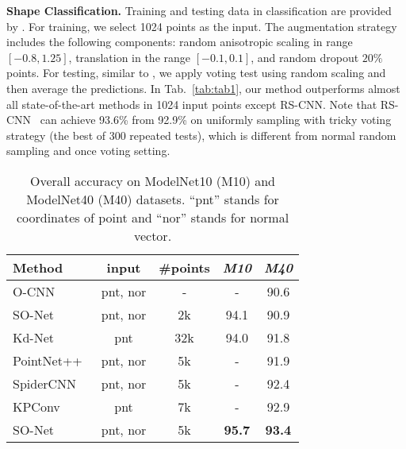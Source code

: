 \documentclass[10pt,twocolumn,letterpaper]{article}
\begin{document}
	
	
	{\noindent\bf Shape Classification.}  Training and testing data in classification are provided by \cite{pointnet}. For training, we select 1024 points as the input. The augmentation strategy includes the following components: random anisotropic scaling in range $[-0.8, 1.25]$, translation in the range $[-0.1, 0.1]$, and random dropout $20\%$ points. For testing, similar to \cite{pointnet,pointnet2}, we apply voting test using random scaling and then average the predictions. 	In Tab.~\ref{tab:tab1}, our method outperforms almost all state-of-the-art methods in 1024 input points except RS-CNN. Note that RS-CNN~\cite{rscnn} can achieve 93.6\% from 92.9\% on uniformly sampling with tricky voting strategy (the best of 300 repeated tests), which is different from normal random sampling and once voting setting.
	
	
	\begin{table}
		\small
		\caption{Overall accuracy on ModelNet10 (M10) and ModelNet40 (M40) datasets. ``pnt'' stands for coordinates of point and ``nor'' stands for normal vector.}
		\begin{center}
			\begin{tabular}{lcccc}
				\hline
				Method &input&\#points &\textit {M10}  &\textit {M40} \\
				\hline
				\hline
				
O-CNN~\cite{wang2017cnn} &pnt, nor&-&-  &90.6 \\
				SO-Net~\cite{So-net} &pnt, nor&2k&94.1  &90.9 \\
				Kd-Net~\cite{KD-Tree} &pnt&32k&  94.0& 91.8 \\
				PointNet++~\cite{pointnet2} &pnt, nor&5k& - & 91.9  \\
				SpiderCNN~\cite{Spidercnn} &pnt, nor &5k& -&  92.4 \\
				KPConv~\cite{KPCONV}  &pnt&7k& -&  92.9 \\
				
				SO-Net~\cite{So-net} &pnt, nor&5k&\textbf{95.7}  &\textbf{93.4} \\
				

\end{tabular}
\end{center}
\end{table}
\end{document}
